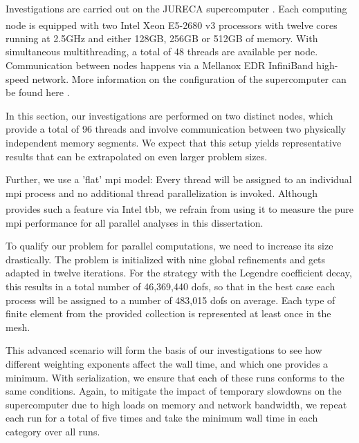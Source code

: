 
Investigations are carried out on the JURECA supercomputer \parencite{krause2016,jureca}. Each computing node is equipped with two Intel\textsuperscript{\textregistered} Xeon\textsuperscript{\textregistered} E5-2680 v3 processors with twelve cores running at 2.5GHz and either 128GB, 256GB or 512GB of memory. With simultaneous multithreading, a total of 48 threads are available per node. Communication between nodes happens via a Mellanox EDR InfiniBand high-speed network. More information on the configuration of the supercomputer can be found here \textcite{jureca}.

In this section, our investigations are performed on two distinct nodes, which provide a total of 96 threads and involve communication between two physically independent memory segments. We expect that this setup yields representative results that can be extrapolated on even larger problem sizes.

Further, we use a 'flat' \gls{mpi} model: Every thread will be assigned to an individual \gls{mpi} process and no additional thread parallelization is invoked. Although \dealii{} provides such a feature via Intel\textsuperscript{\textregistered} \gls{tbb}, we refrain from using it to measure the pure \gls{mpi} performance for all parallel analyses in this dissertation.


To qualify our problem for parallel computations, we need to increase its size drastically. The problem is initialized with nine global refinements and gets adapted in twelve iterations. For the strategy with the Legendre coefficient decay, this results in a total number of 46,369,440 \glspl{dof}, so that in the best case each process will be assigned to a number of 483,015 \glspl{dof} on average. Each type of finite element from the provided collection is represented at least once in the mesh.

This advanced scenario will form the basis of our investigations to see how different weighting exponents affect the wall time, and which one provides a minimum. With serialization, we ensure that each of these runs conforms to the same conditions. Again, to mitigate the impact of temporary slowdowns on the supercomputer due to high loads on memory and network bandwidth, we repeat each run for a total of five times and take the minimum wall time in each category over all runs.


